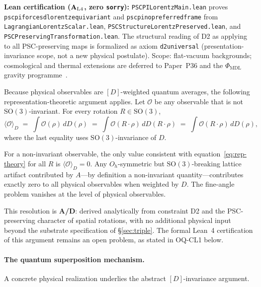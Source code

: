 \documentclass[12pt,letterpaper]{article}
\newcommand{\Dclass}{[D]}
\newcommand{\catAL}{\ensuremath{\textbf{A}_{\rm L4}}}
\newcommand{\catAD}{\textbf{A/D}}
\newcommand{\lean}[1]{%
  \penalty-100
  \begingroup\def\_{\textunderscore\allowbreak}\texttt{#1}\endgroup}
\begin{document}
\noindent\textbf{Lean certification (\catAL, zero \texttt{sorry}):}
\lean{PSCPILorentzMain.lean} proves
\lean{psc\_pi\_forces\_d\_lorentz\_equivariant}
and \lean{psc\_pi\_no\_preferred\_frame}\newline
from \lean{LagrangianLorentzScalar\allowbreak.lean},
\lean{PSCStructureLorentz\-Preserved.lean}, and
\lean{PSCPreserving\-Transformation.lean}.
The structural reading of D2 as applying to all PSC-preserving maps is formalized as
axiom \lean{d2\_universal} (presentation-invariance scope, not a new physical postulate).
Scope: flat-vacuum backgrounds; cosmological and thermal extensions are deferred to
Paper~P36 and the $\Phi_{\mathrm{MDL}}$ gravity programme~\cite{SpivackEmergentGravity}.

Because physical observables are $\Dclass$-weighted quantum averages, the following
representation-theoretic argument applies.  Let $\mathcal{O}$ be any observable that
is not $\mathrm{SO}(3)$-invariant.  For every rotation $R \in \mathrm{SO}(3)$,
\begin{equation}
  \langle \mathcal{O} \rangle_D
  \;=\; \int \mathcal{O}(\rho)\,dD(\rho)
  \;=\; \int \mathcal{O}(R\cdot\rho)\,dD(R\cdot\rho)
  \;=\; \int \mathcal{O}(R\cdot\rho)\,dD(\rho),
  \label{eq:rep-theory}
\end{equation}
where the last equality uses $\mathrm{SO}(3)$-invariance of $D$.

For a non-invariant observable, the only value consistent with
equation~\eqref{eq:rep-theory} for all $R$ is $\langle\mathcal{O}\rangle_D = 0$.
Any $O_h$-symmetric but $\mathrm{SO}(3)$-breaking lattice artifact contributed by
$A$---by definition a non-invariant quantity---contributes exactly zero to all
physical observables when weighted by $D$.  The fine-angle problem vanishes at the
level of physical observables.

This resolution is \catAD: derived analytically from constraint D2 and the
PSC-preserving character of spatial rotations, with no additional physical input
beyond the substrate specification of \S\ref{sec:triple}.  The formal Lean~4
certification of this argument remains an open problem, as stated in OQ-CL1 below.

\paragraph{The quantum superposition mechanism.}

A concrete physical realization underlies the abstract $\Dclass$-invariance argument.
\end{document}
